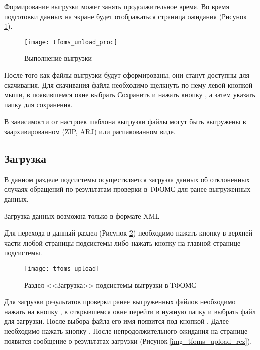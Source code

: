Формирование выгрузки может занять продолжительное время. Во время подготовки данных на экране будет отображаться страница ожидания (Рисунок \ref{img_tfoms_unload_proc}).

\begin{figure}[ht]\centering
 \texttt{[image: tfoms\_unload\_proc]}
 \caption{Выполнение выгрузки}
 \label{img_tfoms_unload_proc}
\end{figure}

После того как файлы выгрузки будут сформированы, они станут доступны для скачивания. Для скачивания файла необходимо щелкнуть по нему левой кнопкой мыши, в появившемся окне выбрать Сохранить и нажать кнопку , а затем указать папку для сохранения.

В зависимости от настроек шаблона выгрузки файлы могут быть выгружены в заархивированном (ZIP, ARJ) или распакованном виде.

\subsection{Загрузка}

В данном разделе подсистемы осуществляется загрузка данных об отклоненных случаях обращений по результатам проверки в ТФОМС для ранее выгруженных данных.

\begin{vnim}
 Загрузка данных возможна только в формате XML
\end{vnim}

Для перехода в данный раздел (Рисунок \ref{img_tfoms_upload}) необходимо нажать кнопку   в верхней части любой страницы подсистемы либо нажать кнопку   на главной странице подсистемы.

\begin{figure}[ht]\centering
 \texttt{[image: tfoms\_upload]}
 \caption{Раздел <<Загрузка>> подсистемы выгрузки в ТФОМС}
 \label{img_tfoms_upload}
\end{figure}

Для загрузки результатов проверки ранее выгруженных файлов необходимо нажать на кнопку , в открывшемся окне перейти в нужную папку и выбрать файл для загрузки. После выбора файла его имя появится под кнопкой . Далее необходимо нажать кнопку . После непродолжительного ожидания на странице появится сообщение о результатах загрузки (Рисунок \ref{img_tfoms_upload_rez}).

